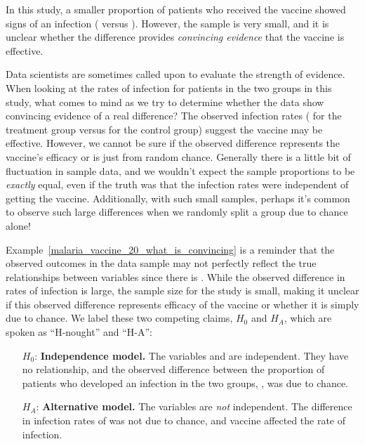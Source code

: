 In this study, a smaller proportion of patients
who received the vaccine showed signs of an infection
(\malariaVIRPerc{} versus \malariaPIRPerc{}).
However, the sample is very small,
and it is unclear whether the difference provides
\emph{convincing evidence} that the vaccine is
effective.

\begin{examplewrap}
\begin{nexample}{Data scientists are sometimes called
    upon to evaluate the strength of evidence.
    When looking at the rates of infection for patients
    in the two groups in this study,
    what comes to mind as we try to determine whether
    the data show convincing evidence of a real difference?}
  \label{malaria_vaccine_20_what_is_convincing}
  The observed infection rates
  (\malariaVIRPerc{} for the treatment group versus
  \malariaPIRPerc{} for the control group)
  suggest the vaccine may be effective.
  However, we cannot be sure if the observed difference
  represents the vaccine's efficacy or is just from
  random chance.
  Generally there is a little bit of fluctuation
  in sample data, and we wouldn't expect the sample
  proportions to be \emph{exactly} equal,
  even if the truth was that the infection rates
  were independent of getting the vaccine.
  Additionally, with such small samples,
  perhaps it's common to observe such large differences
  when we randomly split a group due to chance alone!
\end{nexample}
\end{examplewrap}

Example~\ref{malaria_vaccine_20_what_is_convincing}
is a reminder that the observed outcomes in the data
sample may not perfectly reflect the true relationships
between variables since there is .
While the observed difference in rates of infection
is large, the sample size for the study is small,
making it unclear if this observed difference represents
efficacy of the vaccine or whether it is simply due to
chance.
We label these two competing claims, $H_0$ and $H_A$,
which are spoken as ``H-nought'' and ``H-A'':
\begin{itemize}
\setlength{\itemsep}{0mm}
\item[$H_0$:] \textbf{Independence model.}
    The variables  and 
    are independent.
    They have no relationship, and the observed difference
    between the proportion of patients who developed
    an infection in the two groups, \malariaIRDiffPerc{},
    was due to chance.
\item[$H_A$:] \textbf{Alternative model.}
    The variables are \emph{not} independent.
    The difference in infection rates of
    \malariaIRDiffPerc{}
    was not due to chance,
    and vaccine affected the rate of infection.
\end{itemize}

